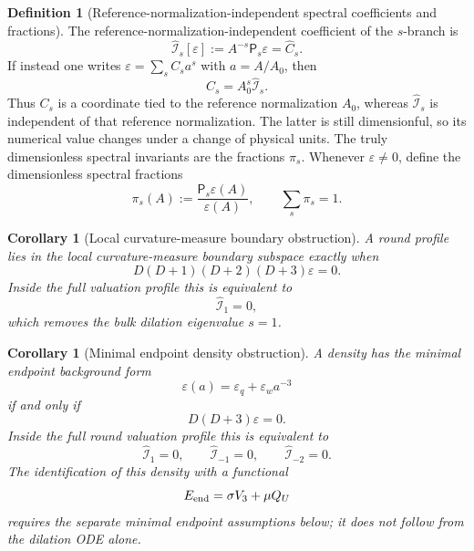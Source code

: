\documentclass[11pt,a4paper]{article}
\def\Dil{D}%
\def\QU{Q_U}%
\numberwithin{equation}{section}
\theoremstyle{definition}
\newtheorem{definition}[criterion]{Definition}
\theoremstyle{plain}
\newtheorem{corollary}[criterion]{Corollary}
\theoremstyle{remark}
\newcommand{\Dil}{\mathscr{D}}
\newcommand{\QU}{Q_U}
\begin{document}
\begin{definition}[Reference-normalization-independent spectral coefficients and fractions]
The reference-normalization-independent coefficient of the \(s\)-branch is
\begin{equation}
\boxed{
\widehat{\mathcal I}_s[\varepsilon]
:=A^{-s}\mathsf P_s\varepsilon
=\widehat C_s.
}
\end{equation}
If instead one writes \(\varepsilon=\sum_s C_s a^s\) with \(a=A/A_0\), then
\begin{equation}
C_s=A_0^s\widehat{\mathcal I}_s.
\end{equation}
Thus \(C_s\) is a coordinate tied to the reference normalization \(A_0\), whereas \(\widehat{\mathcal I}_s\) is independent of that reference normalization. The latter is still dimensionful, so its numerical value changes under a change of physical units. The truly dimensionless spectral invariants are the fractions \(\pi_s\). Whenever \(\varepsilon\neq0\), define the dimensionless spectral fractions
\begin{equation}
\boxed{
\pi_s(A):=\frac{\mathsf P_s\varepsilon(A)}{\varepsilon(A)},
\qquad
\sum_s\pi_s=1.
}
\end{equation}
\end{definition}

\begin{corollary}[Local curvature-measure boundary obstruction]
A round profile lies in the local curvature-measure boundary subspace exactly when
\begin{equation}
\boxed{
\Dil(\Dil+1)(\Dil+2)(\Dil+3)\varepsilon=0.
}
\end{equation}
Inside the full valuation profile this is equivalent to
\begin{equation}
\widehat{\mathcal I}_1=0,
\end{equation}
which removes the bulk dilation eigenvalue \(s=1\).
\end{corollary}

\begin{corollary}[Minimal endpoint density obstruction]
A density has the minimal endpoint background form
\begin{equation}
\varepsilon(a)=\varepsilon_q+\varepsilon_w a^{-3}
\end{equation}
if and only if
\begin{equation}
\boxed{
\Dil(\Dil+3)\varepsilon=0.
}
\end{equation}
Inside the full round valuation profile this is equivalent to
\begin{equation}
\widehat{\mathcal I}_{1}=0,
\qquad
\widehat{\mathcal I}_{-1}=0,
\qquad
\widehat{\mathcal I}_{-2}=0.
\end{equation}
The identification of this density with a functional
\begin{equation}
E_{\rm end}=\sigma V_3+\mu\QU
\end{equation}
requires the separate minimal endpoint assumptions below; it does not follow from the dilation ODE alone.
\end{corollary}
\end{document}
